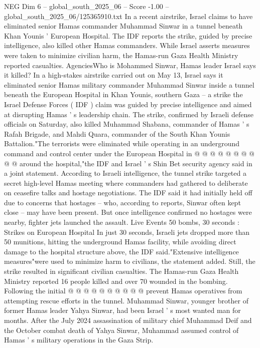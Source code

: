 \begin{textsample}{NEG Dim 6 – global\_south\_2025\_06 – Score -1.00 – global\_south\_2025\_06/125365910.txt}  \label{ex:f6_neg_426}
In a recent airstrike, Israel claims to have eliminated senior Hamas commander Muhammad Sinwar in a tunnel beneath Khan Younis ' European Hospital.
The IDF reports the strike, guided by precise intelligence, also killed other Hamas commanders.
While Israel asserts measures were taken to minimize civilian harm, the Hamas-run Gaza Health Ministry reported casualties.
AgenciesWho is Mohammed Sinwar, Hamas leader Israel says it killed?
In a high-stakes airstrike carried out on May 13, Israel says it eliminated senior Hamas military commander Muhammad Sinwar inside a tunnel beneath the European Hospital in Khan Younis, southern Gaza -- a strike the Israel Defense Forces ( IDF ) claim was guided by precise intelligence and aimed at disrupting Hamas ' s leadership chain.
The strike, confirmed by Israeli defense officials on Saturday, also killed Muhammad Shabana, commander of Hamas ' s Rafah Brigade, and Mahdi Quara, commander of the South Khan Younis Battalion."The terrorists were eliminated while operating in an underground command and control center under the European Hospital in @ @ @ @ @ @ @ @ @ @ around the hospital,"the IDF and Israel ' s Shin Bet security agency said in a joint statement.
According to Israeli intelligence, the tunnel strike targeted a secret high-level Hamas meeting where commanders had gathered to deliberate on ceasefire talks and hostage negotiations.
The IDF said it had initially held off due to concerns that hostages -- who, according to reports, Sinwar often kept close -- may have been present.
But once intelligence confirmed no hostages were nearby, fighter jets launched the assault.
Live Events 50 bombs, 30 seconds : Strikes on European Hospital In just 30 seconds, Israeli jets dropped more than 50 munitions, hitting the underground Hamas facility, while avoiding direct damage to the hospital structure above, the IDF said."Extensive intelligence measures"were used to minimize harm to civilians, the statement added.
Still, the strike resulted in significant civilian casualties.
The Hamas-run Gaza Health Ministry reported 16 people killed and over 70 wounded in the bombing.
Following the initial @ @ @ @ @ @ @ @ @ @ prevent Hamas operatives from attempting rescue efforts in the tunnel.
Muhammad Sinwar, younger brother of former Hamas leader Yahya Sinwar, had been Israel ' s most wanted man for months.
After the July 2024 assassination of military chief Muhammad Deif and the October combat death of Yahya Sinwar, Muhammad assumed control of Hamas ' s military operations in the Gaza Strip.

\end{textsample}
